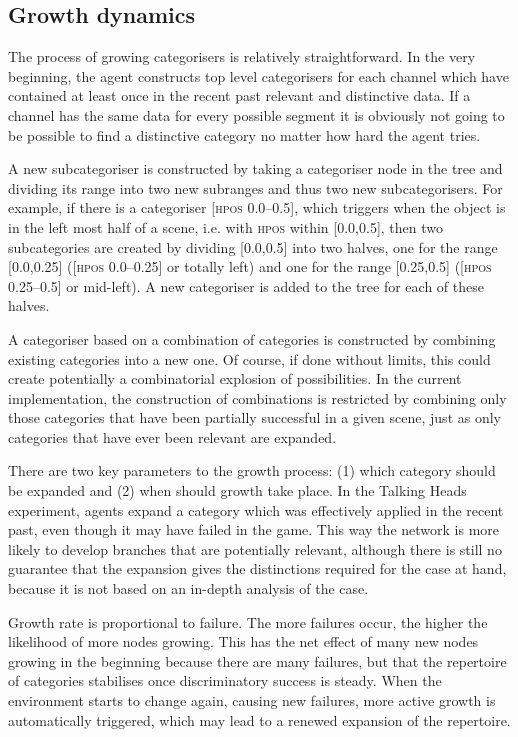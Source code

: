 \subsection{Growth dynamics}

The process of growing categorisers is relatively
straightforward. In the very beginning, the agent
constructs top level categorisers for each channel which 
have contained at least once 
in the recent past relevant and distinctive
data. If a channel has the same data for every 
possible segment it is obviously not going to be 
possible to find a distinctive category no matter
how hard the agent tries. 

A new subcategoriser is constructed by taking a
categoriser node in the tree and dividing its range into 
two new subranges and thus two new subcategorisers.
For example, if there is a 
categoriser [\textsc{hpos} 0.0–0.5], which triggers when the 
object is in the left most half of a scene, i.e. with \textsc{hpos}
within [0.0,0.5], then two 
subcategories are created by dividing [0.0,0.5]
into two halves, one for the 
range [0.0,0.25] ([\textsc{hpos} 0.0–0.25] or totally left) 
and one for the range [0.25,0.5] ([\textsc{hpos} 0.25–0.5] or mid-left). 
A new categoriser is added to the tree for each of these
halves. 

A categoriser based on a combination of categories is 
constructed by combining existing categories into a new one. 
Of course, if done without limits, this could create potentially 
a combinatorial explosion of possibilities. In the 
current implementation, the construction of combinations
is restricted by combining only those categories that 
have been partially successful in a given scene, 
just as only categories that
have ever been relevant are expanded. 

There are two key parameters to the growth process: 
(1) which category should be expanded and (2) when should
growth take place. In the Talking Heads experiment, agents expand 
a category which was effectively applied in the 
recent past, even though it may have failed in the game. 
This way the network is more likely to 
develop branches that are potentially relevant, although 
there is still no guarantee that the expansion
gives the distinctions required for the case at hand, 
because it is not based on an in-depth analysis of 
the case. 

Growth rate is proportional to failure. The more failures 
occur, the higher the likelihood of more nodes growing. This has the 
net effect of many new nodes growing in the beginning because
there are many failures, but that the repertoire of
categories stabilises
once discriminatory success is steady. When the environment 
starts to change again, causing new failures, more active 
growth is automatically triggered, which may lead 
to a renewed expansion of the repertoire. 

